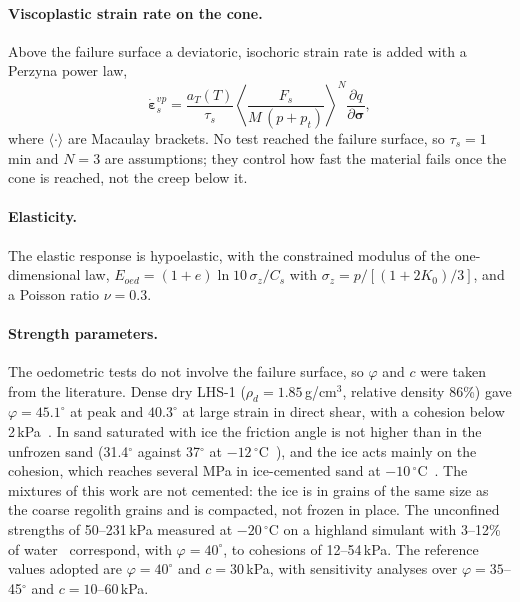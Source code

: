 \paragraph{Viscoplastic strain rate on the cone.} Above the failure surface a deviatoric, isochoric strain rate is added with a Perzyna power law,
\begin{equation}
    \dot{\boldsymbol\varepsilon}^{vp}_s = \frac{a_T(T)}{\tau_s}\left\langle\frac{F_s}{M\,(p+p_t)}\right\rangle^{N}\frac{\partial q}{\partial\boldsymbol\sigma},
    \label{eq:perzyna_cone}
\end{equation}
where $\langle\cdot\rangle$ are Macaulay brackets. No test reached the failure surface, so $\tau_s = 1$\,min and $N = 3$ are assumptions; they control how fast the material fails once the cone is reached, not the creep below it.

\paragraph{Elasticity.} The elastic response is hypoelastic, with the constrained modulus of the one-dimensional law, $E_{oed} = (1+e)\ln10\,\sigma_z/C_s$ with $\sigma_z = p/[(1+2K_0)/3]$, and a Poisson ratio $\nu = 0.3$.

\paragraph{Strength parameters.} The oedometric tests do not involve the failure surface, so $\varphi$ and $c$ were taken from the literature. Dense dry LHS-1 ($\rho_d = 1.85$\,g/cm$^3$, relative density 86\%) gave $\varphi = 45.1^\circ$ at peak and $40.3^\circ$ at large strain in direct shear, with a cohesion below 2\,kPa~\cite{yin2023shear}. In sand saturated with ice the friction angle is not higher than in the unfrozen sand (31.4$^\circ$ against 37$^\circ$ at $-12\,^\circ$C~\cite{alkire1973}), and the ice acts mainly on the cohesion, which reaches several MPa in ice-cemented sand at $-10\,^\circ$C~\cite{parameswaran1981}. The mixtures of this work are not cemented: the ice is in grains of the same size as the coarse regolith grains and is compacted, not frozen in place. The unconfined strengths of 50--231\,kPa measured at $-20\,^\circ$C on a highland simulant with 3--12\% of water~\cite{pitcher2016} correspond, with $\varphi = 40^\circ$, to cohesions of 12--54\,kPa. The reference values adopted are $\varphi = 40^\circ$ and $c = 30$\,kPa, with sensitivity analyses over $\varphi = 35$--45$^\circ$ and $c = 10$--60\,kPa.

